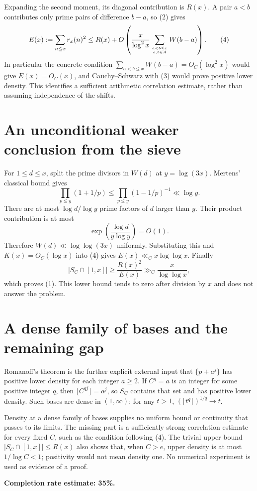 \documentclass[11pt]{article}
\begin{document}
Expanding the second moment, its diagonal contribution is $R(x)$. A pair $a<b$ contributes only prime pairs of difference $b-a$, so (2) gives
\[
 E(x):=\sum_{n\le x}r_x(n)^2
 \le R(x)+O\left(\frac{x}{\log^2x}
       \sum_{a<b\le x\atop a,b\in A}W(b-a)\right). \tag{4}
\]
In particular the concrete condition $\sum_{a<b\le x}W(b-a)=O_C(\log^2x)$ would give $E(x)=O_C(x)$, and Cauchy--Schwarz with (3) would prove positive lower density. This identifies a sufficient arithmetic correlation estimate, rather than assuming independence of the shifts.

\section*{An unconditional weaker conclusion from the sieve}
For $1\le d\le x$, split the prime divisors in $W(d)$ at $y=\log(3x)$. Mertens' classical bound gives
\[
 \prod_{p\le y}(1+1/p)\le\prod_{p\le y}(1-1/p)^{-1}\ll\log y.
\]
There are at most $\log d/\log y$ prime factors of $d$ larger than $y$. Their product contribution is at most
\[
 \exp\left(\frac{\log d}{y\log y}\right)=O(1).
\]
Therefore $W(d)\ll\log\log(3x)$ uniformly. Substituting this and $K(x)=O_C(\log x)$ into (4) gives $E(x)\ll_C x\log\log x$. Finally
\[
 |S_C\cap[1,x]|\ge\frac{R(x)^2}{E(x)}\gg_C\frac{x}{\log\log x},
\]
which proves (1). This lower bound tends to zero after division by $x$ and does not answer the problem.

\section*{A dense family of bases and the remaining gap}
Romanoff's theorem is the further explicit external input that $\{p+a^j\}$ has positive lower density for each integer $a\ge2$. If $C^q=a$ is an integer for some positive integer $q$, then $\lfloor C^{qj}\rfloor=a^j$, so $S_C$ contains that set and has positive lower density. Such bases are dense in $(1,\infty)$: for any $t>1$, $(\lfloor t^q\rfloor)^{1/q}\to t$.

Density at a dense family of bases supplies no uniform bound or continuity that passes to its limits. The missing part is a sufficiently strong correlation estimate for every fixed $C$, such as the condition following (4). The trivial upper bound $|S_C\cap[1,x]|\le R(x)$ also shows that, when $C>e$, upper density is at most $1/\log C<1$; positivity would not mean density one. No numerical experiment is used as evidence of a proof.

\textbf{Completion rate estimate: 35\%.}
\end{document}
